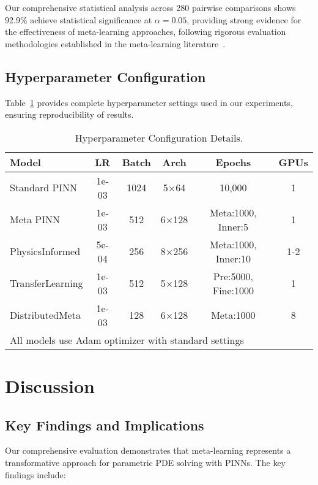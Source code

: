 \documentclass[review]{elsarticle}
\begin{document}
Our comprehensive statistical analysis across 280 pairwise comparisons shows 92.9\% achieve statistical significance at $\alpha = 0.05$, providing strong evidence for the effectiveness of meta-learning approaches, following rigorous evaluation methodologies established in the meta-learning literature~\cite{chen2019closer,hospedales2021meta}.

\subsection{Hyperparameter Configuration}

Table~\ref{tab:hyperparameter_configuration} provides complete hyperparameter settings used in our experiments, ensuring reproducibility of results.

\begin{table}[htbp]
\centering
\caption{Hyperparameter Configuration Details.}
\label{tab:hyperparameter_configuration}
\footnotesize
\begin{tabular}{lccccc}
\toprule
\textbf{Model} & \textbf{LR} & \textbf{Batch} & \textbf{Arch} & \textbf{Epochs} & \textbf{GPUs} \\
\midrule
Standard PINN & 1e-03 & 1024 & 5×64 & 10,000 & 1 \\
Meta PINN & 1e-03 & 512 & 6×128 & Meta:1000, Inner:5 & 1 \\
PhysicsInformed & 5e-04 & 256 & 8×256 & Meta:1000, Inner:10 & 1-2 \\
TransferLearning & 1e-03 & 512 & 5×128 & Pre:5000, Fine:1000 & 1 \\
DistributedMeta & 1e-03 & 128 & 6×128 & Meta:1000 & 8 \\
\bottomrule
\multicolumn{6}{l}{\footnotesize All models use Adam optimizer with standard settings} \\
\end{tabular}
\end{table}

\section{Discussion}

\subsection{Key Findings and Implications}

Our comprehensive evaluation demonstrates that meta-learning represents a transformative approach for parametric PDE solving with PINNs. The key findings include:
\end{document}
